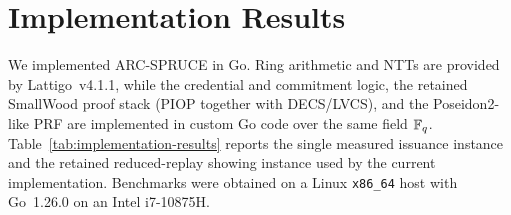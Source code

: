 \section{Implementation Results}
\label{sec:implementation-results}

We implemented ARC-SPRUCE in Go. Ring arithmetic and NTTs are provided by Lattigo~v4.1.1, while the
credential and commitment logic, the retained SmallWood proof stack (PIOP together with DECS/LVCS), and the
Poseidon2-like PRF are implemented in custom Go code over the same field \(\mathbb{F}_q\). Table~\ref{tab:implementation-results}
reports the single measured issuance instance and the retained reduced-replay showing instance used by the current
implementation. Benchmarks were obtained on a Linux \texttt{x86\_64} host with Go~1.26.0 on an Intel i7-10875H.

